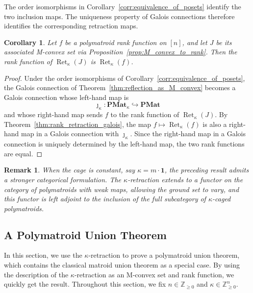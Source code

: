 \documentclass[10pt,a4paper]{amsart}
\newtheorem{corollary}[theorem]{Corollary}
\newtheorem{remark}[theorem]{Remark}
\newcommand{\Zgeq}{\mathbb{Z}_{\geq 0}}       %
\newcommand{\Zgeqn}{\mathbb{Z}_{\geq 0}^n}     %
\newcommand{\ones}{\textbf{1}}
\newcommand{\PMat}{\mathbf{PMat}}      %
\newcommand{\PMatK}{\mathbf{PMat}_\kappa}
\DeclareMathOperator{\Ret}{Ret}                %
\newcommand{\RetK}{\Ret_{\kappa}}              %
\begin{document}
The order isomorphisms in
Corollary~\ref{corr:equivalence_of_posets} identify the two inclusion
maps. The uniqueness property of Galois connections therefore identifies
the corresponding retraction maps.

\begin{corollary}\label{cor:both_reflections_same}
    Let $f$ be a polymatroid rank function on $[n]$, and let $J$ be its
    associated M-convex set via
    Proposition~\ref{prop:M_convex_to_rank}. Then the rank function of
    $\RetK(J)$ is $\RetK(f)$.
\end{corollary}

\begin{proof}
    Under the order isomorphisms of
    Corollary~\ref{corr:equivalence_of_posets}, the Galois connection of
    Theorem~\ref{thm:reflection_as_M_convex} becomes a Galois connection whose
    left-hand map is
    \[
        \jmath_\kappa\colon\PMatK\hookrightarrow\PMat
    \]
    and whose right-hand map sends $f$ to the rank function of $\RetK(J)$.
    By Theorem~\ref{thm:rank_retraction_galois}, the map
    $f\mapsto\RetK(f)$ is also a right-hand map in a Galois connection with
    $\jmath_\kappa$. Since the right-hand map in a Galois connection is
    uniquely determined by the left-hand map, the two rank functions are
    equal.
\end{proof}

\begin{remark}\label{remark:categorical_retraction}
    When the cage is constant, say $\kappa=m\cdot \ones$, the preceding result admits
    a stronger categorical formulation. The $\kappa$-retraction extends to a
    functor on the category of polymatroids with weak maps, allowing the ground
    set to vary, and this functor is left adjoint to the inclusion of the full
    subcategory of $\kappa$-caged polymatroids.
\end{remark}

\subsection{A Polymatroid Union Theorem}

In this section, we use the $\kappa$-retraction to prove a polymatroid union
theorem, which contains the classical matroid union theorem as a special
case. By using the description of the $\kappa$-retraction as an M-convex set
and rank function, we quickly get the result. Throughout this section, we
fix $n\in\Zgeq$ and $\kappa\in\Zgeqn$.
\end{document}
